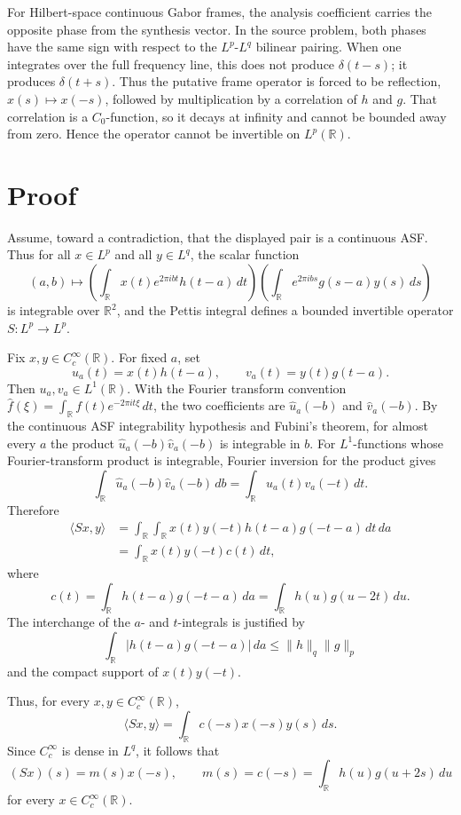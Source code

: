 \documentclass[11pt]{article}
\newcommand{\R}{\mathbb R}
\begin{document}
For Hilbert-space continuous Gabor frames, the analysis coefficient carries the
opposite phase from the synthesis vector.  In the source problem, both phases
have the same sign with respect to the \(L^p\)-\(L^q\) bilinear pairing.  When
one integrates over the full frequency line, this does not produce
\(\delta(t-s)\); it produces \(\delta(t+s)\).  Thus the putative frame operator
is forced to be reflection, \(x(s)\mapsto x(-s)\), followed by multiplication
by a correlation of \(h\) and \(g\).  That correlation is a \(C_0\)-function, so
it decays at infinity and cannot be bounded away from zero.  Hence the operator
cannot be invertible on \(L^p(\mathbb R)\).

\section*{Proof}

Assume, toward a contradiction, that the displayed pair is a continuous ASF.
Thus for all \(x\in L^p\) and all \(y\in L^q\), the scalar function
\[
 (a,b)\mapsto
 \left(\int_\R x(t)e^{2\pi i bt}h(t-a)\,dt\right)
 \left(\int_\R e^{2\pi i bs}g(s-a)y(s)\,ds\right)
\]
is integrable over \(\R^2\), and the Pettis integral defines a bounded
invertible operator \(S:L^p\to L^p\).

Fix \(x,y\in C_c^\infty(\mathbb R)\).  For fixed \(a\), set
\[
  u_a(t)=x(t)h(t-a),\qquad v_a(t)=y(t)g(t-a).
\]
Then \(u_a,v_a\in L^1(\mathbb R)\).  With the Fourier transform convention
\(\widehat f(\xi)=\int_\R f(t)e^{-2\pi i t\xi}\,dt\), the two coefficients are
\(\widehat u_a(-b)\) and \(\widehat v_a(-b)\).  By the continuous ASF
integrability hypothesis and Fubini's theorem, for almost every \(a\) the
product \(\widehat u_a(-b)\widehat v_a(-b)\) is integrable in \(b\).  For
\(L^1\)-functions whose Fourier-transform product is integrable, Fourier
inversion for the product gives
\[
 \int_\R \widehat u_a(-b)\widehat v_a(-b)\,db
 =\int_\R u_a(t)v_a(-t)\,dt .
\]
Therefore
\begin{align*}
 \langle Sx,y\rangle
 &= \int_\R\int_\R x(t)y(-t)h(t-a)g(-t-a)\,dt\,da  \\
 &= \int_\R x(t)y(-t)c(t)\,dt,
\end{align*}
where
\[
  c(t)=\int_\R h(t-a)g(-t-a)\,da
      =\int_\R h(u)g(u-2t)\,du .
\]
The interchange of the \(a\)- and \(t\)-integrals is justified by
\[
 \int_\R |h(t-a)g(-t-a)|\,da
 \le \|h\|_q\|g\|_p
\]
and the compact support of \(x(t)y(-t)\).

Thus, for every \(x,y\in C_c^\infty(\mathbb R)\),
\[
  \langle Sx,y\rangle=\int_\R c(-s)x(-s)y(s)\,ds.
\]
Since \(C_c^\infty\) is dense in \(L^q\), it follows that
\[
  (Sx)(s)=m(s)x(-s),\qquad m(s)=c(-s)=\int_\R h(u)g(u+2s)\,du
\]
for every \(x\in C_c^\infty(\mathbb R)\).
\end{document}
